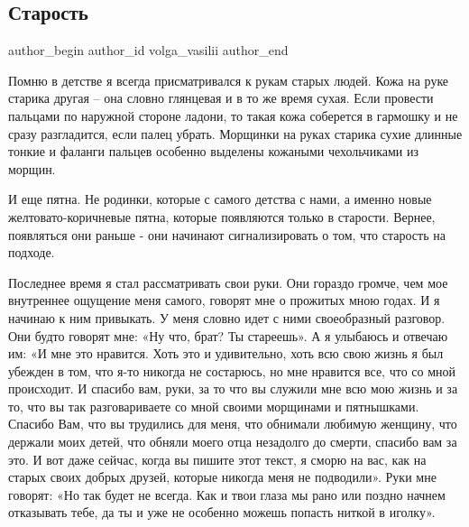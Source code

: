  
 
 
 
 
 
\subsection{Старость}
\label{sec:01_12_2020.fb.volga_vasilii.1.starost}
\ifcmt
	author_begin
   author_id volga_vasilii
	author_end
\fi

Помню в детстве я всегда присматривался к рукам старых людей. Кожа на руке
старика другая – она словно глянцевая и в то же время сухая. Если провести
пальцами по наружной стороне ладони, то такая кожа соберется в гармошку и не
сразу разгладится, если палец убрать. Морщинки на руках старика сухие длинные
тонкие и фаланги пальцев особенно выделены кожаными чехольчиками из морщин. 

И еще пятна. Не родинки, которые с самого детства с нами, а именно новые
желтовато-коричневые пятна, которые появляются только в старости. Вернее,
появляться они раньше - они начинают сигнализировать о том, что старость на
подходе. 

Последнее время я стал рассматривать свои руки. Они гораздо громче, чем мое
внутреннее ощущение меня самого, говорят мне о прожитых мною годах. И я начинаю
к ним привыкать. У меня словно идет с ними своеобразный разговор. Они будто
говорят мне: «Ну что, брат? Ты стареешь». А я улыбаюсь и отвечаю им: «И мне это
нравится. Хоть это и удивительно, хоть всю свою жизнь я был убежден в том, что
я-то никогда не состарюсь, но мне нравится все, что со мной происходит. И
спасибо вам, руки, за то что вы служили мне всю мою жизнь и за то, что вы так
разговариваете со мной своими морщинами и пятнышками. Спасибо Вам, что вы
трудились для меня, что обнимали любимую женщину, что держали моих детей, что
обняли моего отца незадолго до смерти, спасибо вам за это. И вот даже сейчас,
когда вы пишите этот текст, я сморю на вас, как на старых своих добрых друзей,
которые никогда меня не подводили». Руки мне говорят: «Но так будет не всегда.
Как и твои глаза мы рано или поздно начнем отказывать тебе, да ты и уже не
особенно можешь попасть ниткой в иголку».  

